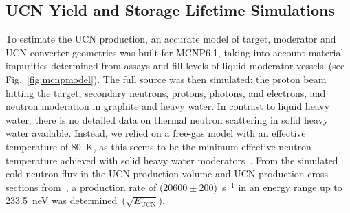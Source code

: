 

\subsection{UCN Yield and Storage Lifetime Simulations~\label{sec:yieldsims}}
To estimate the UCN production, an accurate model of target, moderator
and UCN converter geometries was built for MCNP6.1, taking into
account material impurities determined from assays and fill levels of
liquid moderator vessels~(see Fig.~\ref{fig:mcnpmodel}). The full
source was then simulated: the proton beam hitting the target,
secondary neutrons, protons, photons, and electrons, and neutron
moderation in graphite and heavy water. In contrast to liquid heavy
water, there is no detailed data on thermal neutron scattering in
solid heavy water available. Instead, we relied on a free-gas model
with an effective temperature of 80~K, as this seems to be the minimum
effective neutron temperature achieved with solid heavy water
moderators~\cite{rush1966}. From the simulated cold neutron flux in
the UCN production volume and UCN production cross sections
from~\cite{Schmidt2015,Korobkina2002}, a production rate of
($20600\pm 200$)~s$^{-1}$ in an energy range up to 233.5~neV was
determined~($\sqrt{E_\mathrm{UCN}}$).

